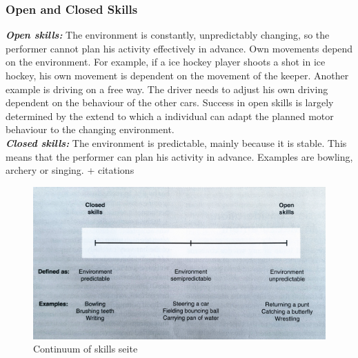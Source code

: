 \subsubsection{Open and Closed Skills}
\textit{\textbf{Open skills:}} The environment is constantly, unpredictably changing, so the performer cannot plan his activity effectively in advance. Own movements depend on the environment. For example, if a ice hockey player shoots a shot in ice hockey, his own movement is dependent on the movement of the keeper. Another example is  driving on a free way. The driver needs to adjust his own driving dependent on the behaviour of the other cars. Success in open skills is largely determined by the extend to which a individual can adapt the planned motor behaviour to the changing environment.\\
\textit{\textbf{Closed skills:}} The environment is predictable, mainly because it is stable. This means that the performer can plan his activity in advance. Examples are bowling, archery or singing.
\todo + citations

\begin{figure}
	\centering
	\includegraphics[width=1.0\textwidth]{img/skills_cont.jpg}
	\caption{Continuum of skills \cite{Schmidt2011} \todo seite}
	\label{fig:skills_cont}
\end{figure}


